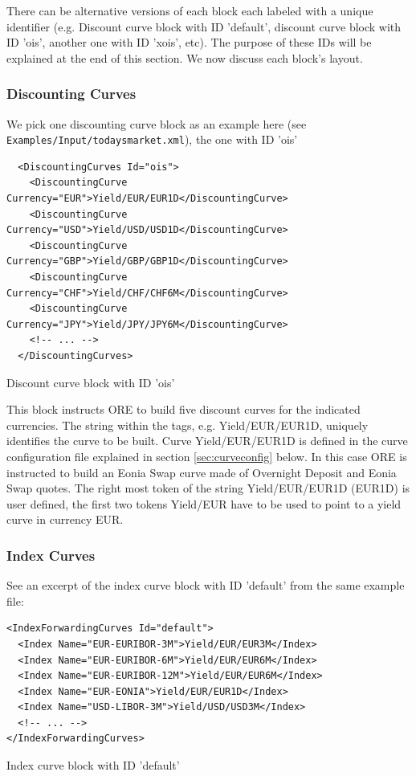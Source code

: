 \documentclass[12pt, a4paper]{article}
\begin{document}
{There can be alternative versions of each block each labeled with a unique identifier (e.g. Discount curve block with ID
'default', discount curve block with ID 'ois', another one with ID 'xois', etc). The purpose of these IDs will be
explained at the end of this section. We now discuss each block's layout.

\subsubsection{Discounting Curves} 

We pick one discounting curve block as an example here (see {\tt Examples/Input/todaysmarket.xml}), the one with ID 'ois' 

\begin{listing}[H]
\begin{verbatim}
  <DiscountingCurves Id="ois">
    <DiscountingCurve Currency="EUR">Yield/EUR/EUR1D</DiscountingCurve>
    <DiscountingCurve Currency="USD">Yield/USD/USD1D</DiscountingCurve>
    <DiscountingCurve Currency="GBP">Yield/GBP/GBP1D</DiscountingCurve>
    <DiscountingCurve Currency="CHF">Yield/CHF/CHF6M</DiscountingCurve>
    <DiscountingCurve Currency="JPY">Yield/JPY/JPY6M</DiscountingCurve>
    <!-- ... -->
  </DiscountingCurves>
\end{verbatim}
\caption{Discount curve block with ID 'ois'}
\label{lst:discountcurve_spec}
\end{listing}

This block instructs ORE to build five discount curves for the indicated currencies. The string within the tags,
e.g. Yield/EUR/EUR1D, uniquely identifies the curve to be built.  Curve Yield/EUR/EUR1D is defined in the curve
configuration file explained in section \ref{sec:curveconfig} below. In this case ORE is instructed to build an Eonia
Swap curve made of Overnight Deposit and Eonia Swap quotes. The right most token of the string Yield/EUR/EUR1D (EUR1D)
is user defined, the first two tokens Yield/EUR have to be used to point to a yield curve in currency EUR.
 
\subsubsection{Index Curves} 

See an excerpt of the index curve block with ID 'default' from the same example file:

\begin{listing}[H]
\begin{verbatim}
<IndexForwardingCurves Id="default">
  <Index Name="EUR-EURIBOR-3M">Yield/EUR/EUR3M</Index>
  <Index Name="EUR-EURIBOR-6M">Yield/EUR/EUR6M</Index>
  <Index Name="EUR-EURIBOR-12M">Yield/EUR/EUR6M</Index>
  <Index Name="EUR-EONIA">Yield/EUR/EUR1D</Index>
  <Index Name="USD-LIBOR-3M">Yield/USD/USD3M</Index>
  <!-- ... -->
</IndexForwardingCurves>
\end{verbatim}
\caption{Index curve block with ID 'default'}
\label{lst:indexcurve_spec}
\end{listing}

}
\end{document}
